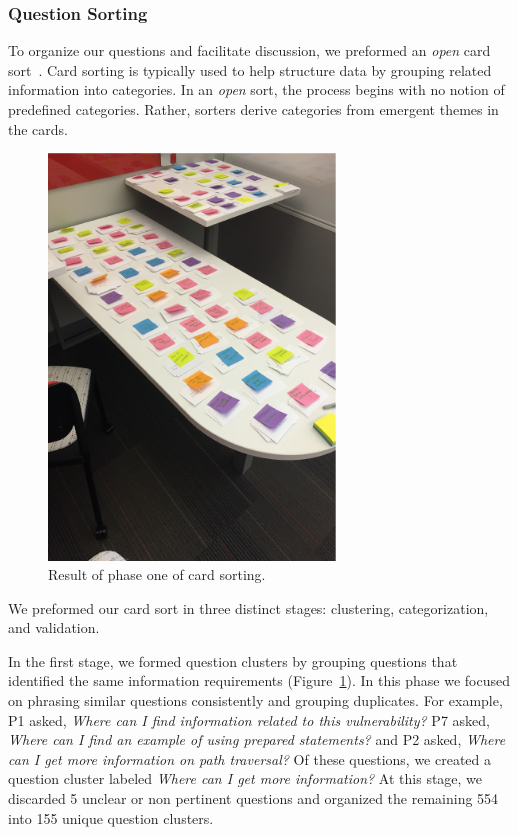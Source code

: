 \documentclass[conference]{IEEEtran}
\begin{document}
\subsubsection{Question Sorting}
To organize our questions and facilitate discussion, we preformed an \textit{open} card sort~\cite{hudson2013sorting}. 
Card sorting is typically used to help structure data by grouping related information into categories. 
In an \textit{open} sort, the process begins with no notion of predefined categories. 
Rather, sorters derive categories from emergent themes in the cards. 

\begin{figure}
\centering
\includegraphics[width=3in]{Images/notecards.pdf}
\caption{Result of phase one of card sorting.}
\label{fig:stageOne} 
\end{figure}

We preformed our card sort in three distinct stages: clustering, categorization, and validation.
 
In the first stage, we formed question clusters by grouping questions that identified the same information requirements (Figure~\ref{fig:stageOne}). 
In this phase we focused on phrasing similar questions consistently and grouping duplicates.
For example, P1 asked, \textit{Where can I find information related to this vulnerability?} P7 asked, \textit{Where can I find an example of using prepared statements?} and P2 asked, \textit{Where can I get more information on path traversal?} 
Of these questions, we created a question cluster labeled \textit{Where can I get more information?}
At this stage, we discarded 5 unclear or non pertinent questions and organized the remaining 554 into 155 unique question clusters.
\end{document}
